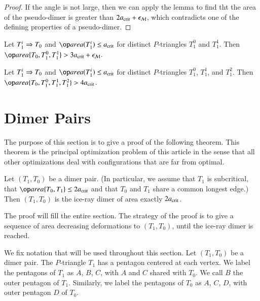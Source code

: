 \begin{proof} 
  If the angle is not large, then we can apply the lemma to find tht
  the area of the pseudo-dimer is greater than $2a_\text{crit} + \epsilon_{\mathcal M}$,
  which contradicts one of the defining properties of a pseudo-dimer.
\end{proof}

\begin{lemma}
  Let $T_1^i\Rightarrow T_0$ and $\area(T_1^i)\le\acrit$  for
  distinct $P$-triangles $T_1^0$ and $T_1^1$.  Then
  $\area\{T_0,T_1^0,T_1^1\} > 3\acrit + \epsM$.
\end{lemma}

\begin{lemma}
  Let $T_1^i\Rightarrow T_0$ and $\area(T_1^i)\le\acrit$ for distinct
  $P$-triangles $T_1^0$, $T_1^1$, and $T_1^2$.  Then
  $\area\{T_0,T_1^0,T_1^1,T_1^2\} > 4\acrit$.
\end{lemma}


\section{Dimer Pairs}

The purpose of this section is to give a proof of the following
theorem.  This theorem is the principal optimization problem of this
article in the sense that all other optimizations deal with
configurations that are far from optimal.


\begin{theorem}
  Let $(T_1,T_0)$ be a dimer pair.  (In particular, we assume that
  $T_1$ is subcritical, that $\area\{T_0,T_1\}\le 2\acrit$ and that
  $T_0$ and $T_1$ share a common longest edge.)  Then $(T_1,T_0)$ is
  the ice-ray dimer of area exactly $2a_\text{crit}$.
\end{theorem}

The proof will fill the entire section.  The strategy of the proof is
to give a sequence of area decreasing deformations to $(T_1,T_0)$,
until the ice-ray dimer is reached.

We fix notation that will be used throughout this section. Let
$(T_1,T_0)$ be a dimer pair.  The $P$-triangle $T_1$ has a pentagon
centered at each vertex.  We label the pentagons of $T_1$ as $A$, $B$,
$C$, with $A$ and $C$ shared with $T_0$.  We call $B$ the outer
pentagon of $T_1$.  Similarly, we label the pentagons of $T_0$ as $A$,
$C$, $D$, with outer pentagon $D$ of $T_0$.


